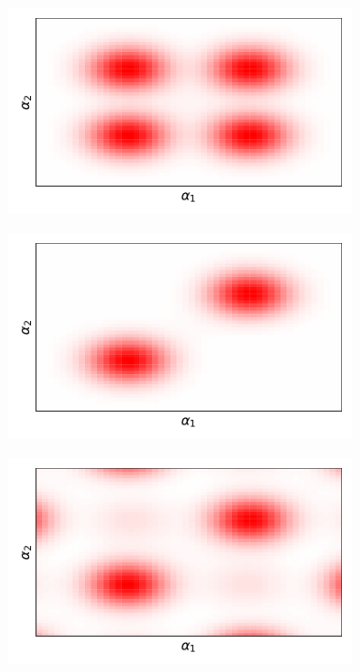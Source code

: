 \begin{figure}[t]
     \centering
     \begin{subfigure}[b]{0.31\textwidth}
         \centering
         \includegraphics[width=\textwidth]{figures/q_mixed.pdf}
         \caption{}
         \label{fig:ground}
     \end{subfigure}
     \hfill
     \begin{subfigure}[b]{0.31\textwidth}
         \centering
         \includegraphics[width=\textwidth]{figures/q_entangled.pdf}
         \caption{}
         \label{fig:initialized_cat}
     \end{subfigure}
     \hfill
     \begin{subfigure}[b]{0.31\textwidth}
         \centering
         \includegraphics[width=\textwidth]{figures/q_actual.pdf}

\end{subfigure}
\end{figure}
